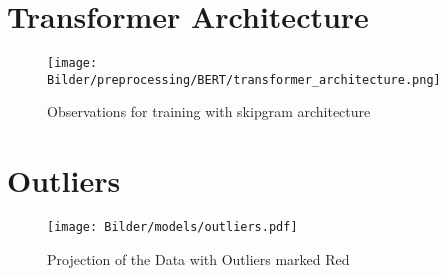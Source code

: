 \newpage
\section{Transformer Architecture}

\begin{figure}[h!]
	\label{fig:transformer}
	\centering
	\texttt{[image: Bilder/preprocessing/BERT/transformer\_architecture.png]}
	\caption{Observations for training with skipgram architecture}
\end{figure}




\newpage
\section{Outliers}

\begin{figure}[h!]
	\centering
	\texttt{[image: Bilder/models/outliers.pdf]}
	\caption{Projection of the Data with Outliers marked Red }
	\label{fig:dbscan-outliers}
\end{figure}